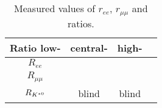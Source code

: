 \begin{table}
\centering
 \caption{Measured values of $r_{ee}$, $r_{\mu\mu}$ and \RKst ratios.}
\begin{tabular}{c|c|c|c}

 Ratio 			low-\qsq & central-\qsq & high-\qsq	\\ \hline
$R_{ee}$ 	& \\ %
$R_{\mu\mu}$ 	& \\ %
\hline $R_{{{K}^{*0}}}$ 	& blind 	& blind  \\

 \end{tabular}
 \label{tab:RKst_results}
\end{table}


%
%
%

